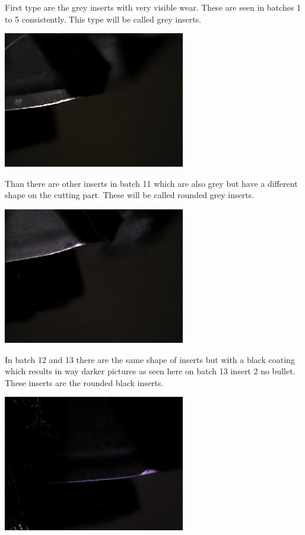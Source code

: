 \documentclass{scrartcl}
\begin{document}
First type are the grey inserts with very visible wear. These are seen in batches 1 to 5 consistently. This type will be called grey inserts.

\includegraphics[width=3.125000in, keepaspectratio=true]{./2_Spaghetti_dataset/gray_b_003_p_004_l_006-011_white_nb.png}



Than there are other inserts in batch 11 which are also grey but have a different shape on the cutting part. These will be called rounded grey inserts.

\includegraphics[width=3.125000in, keepaspectratio=true]{./2_Spaghetti_dataset/rounded_grey_b_011_p_008_l_006-011_white_nb.png}

In batch 12 and 13 there are the same shape of inserts but with a black coating which results in way darker pictures as seen here on batch 13 insert 2 no bullet. These inserts are the rounded black inserts.

\includegraphics[width=3.125000in, keepaspectratio=true]{./2_Spaghetti_dataset/rounded_black_b_013_p_002_l_006-011_white_nb.png}
\end{document}
